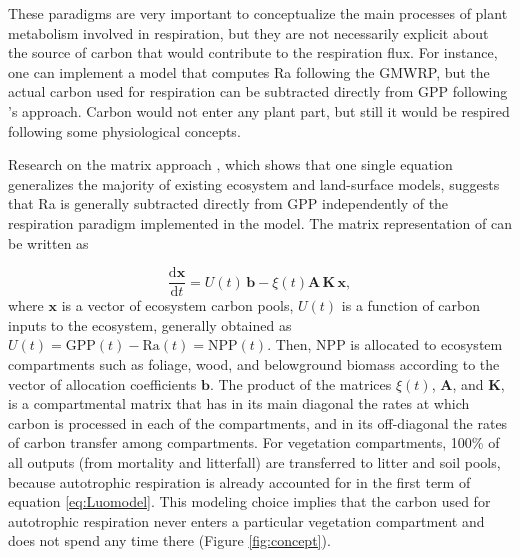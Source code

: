 \documentclass[bg, manuscript]{copernicus}
\begin{document}
These paradigms are very important to conceptualize the main processes of plant metabolism involved in respiration, but they are not necessarily explicit about the source of carbon that would contribute to the respiration flux. For instance, one can implement a model that computes Ra following the GMWRP, but the actual carbon used for respiration can be subtracted directly from GPP following \citeauthor{Waring1998}'s \citeyearpar{Waring1998} approach. Carbon would not enter any plant part, but still it would be respired following some physiological concepts. 

Research on the matrix approach \citep{Luo2017}, which shows that one single equation generalizes the majority of existing ecosystem and land-surface models, suggests that Ra is generally subtracted directly from GPP independently of the respiration paradigm implemented in the model.
The matrix representation of \citet{Luo2017} can be written as

\begin{equation} \label{eq:Luomodel}
\frac{\mathrm{d} \bm{x}}{\mathrm{d}t} =  U(t) \, \bm{b} - \xi(t) \mathbf{A} \, \mathbf{K} \, \bm{x},
\end{equation}
where $\bm{x}$ is a vector of ecosystem carbon pools, $U(t)$ is a function of carbon inputs to the ecosystem, generally obtained as $U(t) = \mathrm{GPP}(t) - \mathrm{Ra}(t) = \mathrm{NPP}(t)$. Then, NPP is allocated to ecosystem compartments such as foliage, wood, and belowground biomass according to the vector of allocation coefficients $\bm{b}$. The product of the matrices $\xi(t)$,  $\mathbf{A}$, and $\mathbf{K}$, is a compartmental matrix that has in its main diagonal the rates at which carbon is processed in each of the compartments, and in its off-diagonal the rates of carbon transfer among compartments. For vegetation compartments, 100\% of all outputs (from mortality and litterfall) are transferred to litter and soil pools, because autotrophic  respiration is already accounted for in the first term of  equation \eqref{eq:Luomodel}. This modeling choice implies that the carbon used for autotrophic respiration never enters a particular vegetation compartment and does not spend any time there (Figure \ref{fig:concept}).
\end{document}
